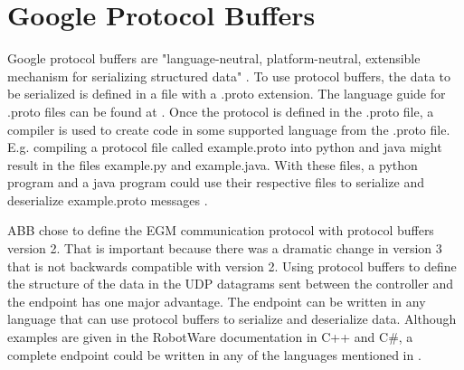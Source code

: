 \documentclass{cslthse-msc}
\begin{document}
\section{Google Protocol Buffers}
\label{sec:Tech_Back:GPB}
Google protocol buffers are "language-neutral, platform-neutral, extensible mechanism for serializing structured data" \cite{Google:Proto_Start}. To use protocol buffers, the data to be serialized is defined in a file with a .proto extension. The language guide for .proto files can be found at \cite{Google:Proto_v2_guide}. Once the protocol is defined in the .proto file, a compiler is used to create code in some supported language from the .proto file. E.g. compiling a protocol file called example.proto into python and java might result in the files example.py and example.java. With these files, a python program and a java program could use their respective files to serialize and deserialize example.proto messages \cite{Google:Proto_Api}.\par

ABB chose to define the EGM communication protocol with protocol buffers version 2. That is important because there was a dramatic change in version 3 that is not backwards compatible with version 2. Using protocol buffers to define the structure of the data in the UDP datagrams sent between the controller and the endpoint has one major advantage. The endpoint can be written in any language that can use protocol buffers to serialize and deserialize data. Although examples are given in the RobotWare documentation in C++ and C\#, a complete endpoint could be written in any of the languages mentioned in \cite{Google:Proto_Other}.
\end{document}
